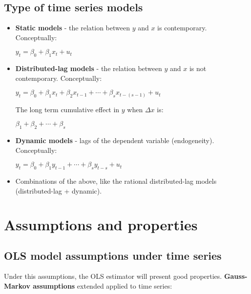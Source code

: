 \documentclass[10pt, a4paper, landscape]{article}
\begin{document}
\begin{multicols}{3}
\subsection*{Type of time series models}

\begin{itemize}[leftmargin=*]
	\item \textbf{Static models} - the relation between \( y \) and \( x \) is contemporary. Conceptually:
	\begin{center}
		\( y_{t} = \beta_{0} + \beta_{1} x_{t} + u_{t} \)
	\end{center}
	\item \textbf{Distributed-lag models} - the relation between \( y \) and \( x \) is not contemporary. Conceptually:
	\begin{center}
		\( y_{t} = \beta_{0} + \beta_{1} x_{t} + \beta_{2} x_{t - 1} + \cdots + \beta_{s} x_{t - (s - 1)} + u_{t} \)
	\end{center}
	The long term cumulative effect in \( y \) when \( \Delta x \) is:
	\begin{center}
		\( \beta_{1} + \beta_{2} + \cdots + \beta_{s} \)
	\end{center}
	\item \textbf{Dynamic models} - lags of the dependent variable (endogeneity). Conceptually:
	\begin{center}
		\( y_{t} = \beta_{0} + \beta_{1} y_{t - 1} + \cdots + \beta_{s} y_{t - s} + u_{t} \)
	\end{center}
		\item Combinations of the above, like the rational distributed-lag models (distributed-lag + dynamic).
\end{itemize}

\columnbreak

\section*{Assumptions and properties}

\subsection*{OLS model assumptions under time series}

Under this assumptions, the OLS estimator will present good properties. \textbf{Gauss-Markov assumptions} extended applied to time series:


\end{multicols}
\end{document}
